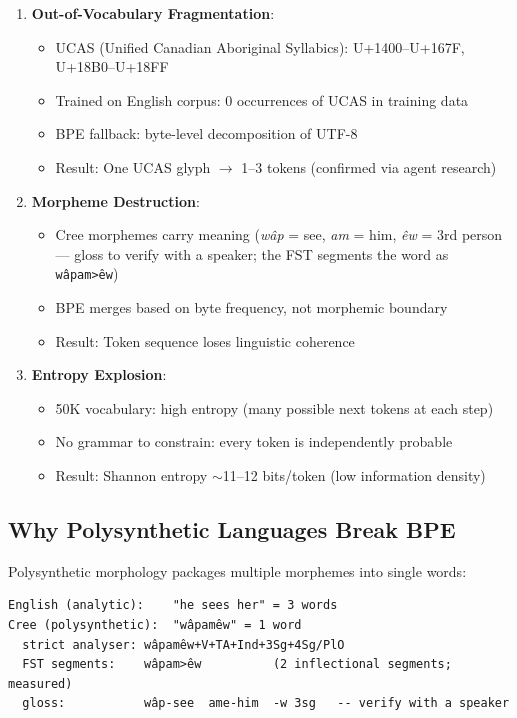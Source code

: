 \documentclass[11pt,oneside]{article}
\begin{document}
\begin{enumerate}
  \item \textbf{Out-of-Vocabulary Fragmentation}:
  \begin{itemize}
    \item UCAS (Unified Canadian Aboriginal Syllabics): U+1400--U+167F, U+18B0--U+18FF
    \item Trained on English corpus: 0 occurrences of UCAS in training data
    \item BPE fallback: byte-level decomposition of UTF-8
    \item Result: One UCAS glyph $\to$ 1--3 tokens (confirmed via agent research)
  \end{itemize}

  \item \textbf{Morpheme Destruction}:
  \begin{itemize}
    \item Cree morphemes carry meaning (\emph{wâp} = see, \emph{am} = him, \emph{êw} = 3rd person --- gloss to verify with a speaker; the FST segments the word as \texttt{wâpam>êw})
    \item BPE merges based on byte frequency, not morphemic boundary
    \item Result: Token sequence loses linguistic coherence
  \end{itemize}

  \item \textbf{Entropy Explosion}:
  \begin{itemize}
    \item 50K vocabulary: high entropy (many possible next tokens at each step)
    \item No grammar to constrain: every token is independently probable
    \item Result: Shannon entropy $\sim$11--12 bits/token (low information density)
  \end{itemize}
\end{enumerate}

\subsection{Why Polysynthetic Languages Break BPE}

Polysynthetic morphology packages multiple morphemes into single words:

\begin{lstlisting}
English (analytic):    "he sees her" = 3 words
Cree (polysynthetic):  "wâpamêw" = 1 word
  strict analyser: wâpamêw+V+TA+Ind+3Sg+4Sg/PlO
  FST segments:    wâpam>êw          (2 inflectional segments; measured)
  gloss:           wâp-see  ame-him  -w 3sg   -- verify with a speaker
\end{lstlisting}
\end{document}
